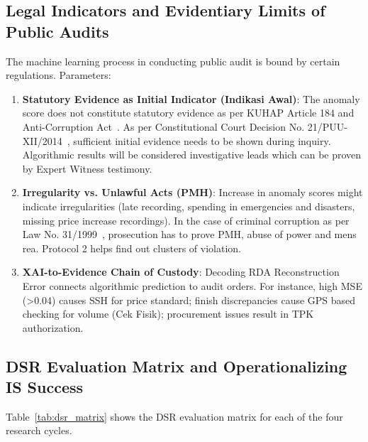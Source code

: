 \documentclass[conference]{IEEEtran}
\begin{document}
\subsection{Legal Indicators and Evidentiary Limits of Public Audits}

The machine learning process in conducting public audit is bound by certain regulations. Parameters:
\begin{enumerate}
    \item \textbf{Statutory Evidence as Initial Indicator (Indikasi Awal)}: The anomaly score does not constitute statutory evidence as per KUHAP Article 184 and Anti-Corruption Act~\cite{ref35}. As per Constitutional Court Decision No. 21/PUU-XII/2014~\cite{ref34}, sufficient initial evidence needs to be shown during inquiry. Algorithmic results will be considered investigative leads which can be proven by Expert Witness testimony.

    \item \textbf{Irregularity vs. Unlawful Acts (PMH)}: Increase in anomaly scores might indicate irregularities (late recording, spending in emergencies and disasters, missing price increase recordings). In the case of criminal corruption as per Law No. 31/1999~\cite{ref34}, prosecution has to prove PMH, abuse of power and mens rea. Protocol 2 helps find out clusters of violation.

    \item \textbf{XAI-to-Evidence Chain of Custody}: Decoding RDA Reconstruction Error connects algorithmic prediction to audit orders. For instance, high MSE (>0.04) causes SSH for price standard; finish discrepancies cause GPS based checking for volume (Cek Fisik); procurement issues result in TPK authorization.

\end{enumerate}

\subsection{DSR Evaluation Matrix and Operationalizing IS Success}

Table~\ref{tab:dsr_matrix} shows the DSR evaluation matrix for each of the four research cycles.
\end{document}

